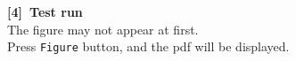 \documentclass{article}
\begin{document}
\begin{enumerate}[\bf\large 1.]
\begin{enumerate}[(1)]
\vspace{75mm}

{\bf [4]\ Test run}\\
\hspace*{10mm}The figure may not appear at first.\\
\hspace*{10mm}Press \verb|Figure| button, and the pdf will be displayed.

  \end{enumerate}

  \end{enumerate}
\end{document}
